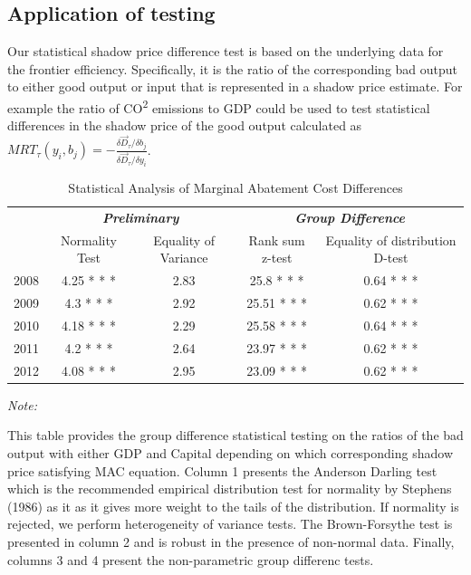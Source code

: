 \documentclass[12pt,]{article}
\begin{document}
\hypertarget{application-of-testing}{%
\subsection{Application of testing}\label{application-of-testing}}

Our statistical shadow price difference test is based on the underlying data for the frontier efficiency. Specifically, it is the ratio of the corresponding bad output to either good output or input that is represented in a shadow price estimate. For example the ratio of CO\textsuperscript{2} emissions to GDP could be used to test statistical differences in the shadow price of the good output calculated as \(MRT_{\tau}(y_{i},b_{j})=-\frac{\delta \vec{D}_{\tau}/\delta b_{j}}{\delta \vec{D}_{\tau}/\delta y_{i}}\).

\begin{table}[H]

\caption{\label{tab:Test1}Statistical Analysis of Marginal Abatement Cost Differences}
\centering
\fontsize{10}{12}\selectfont
\begin{threeparttable}
\begin{tabular}[t]{lcccc}
\toprule
\multicolumn{1}{c}{\em{\textbf{}}} & \multicolumn{2}{c}{\em{\textbf{Preliminary}}} & \multicolumn{2}{c}{\em{\textbf{Group Difference }}} \\
\cmidrule(l{3pt}r{3pt}){2-3} \cmidrule(l{3pt}r{3pt}){4-5}
  & Normality Test & Equality of Variance & Rank sum z-test & Equality of distribution D-test\\
\midrule
2008 & 4.25 * * * & 2.83 & 25.8 * * * & 0.64 * * *\\
2009 & 4.3 * * * & 2.92 & 25.51 * * * & 0.62 * * *\\
2010 & 4.18 * * * & 2.29 & 25.58 * * * & 0.64 * * *\\
2011 & 4.2 * * * & 2.64 & 23.97 * * * & 0.62 * * *\\
2012 & 4.08 * * * & 2.95 & 23.09 * * * & 0.62 * * *\\
\bottomrule
\end{tabular}
\begin{tablenotes}
\item \textit{Note: } 
\item This table provides the group difference statistical testing on the ratios of the bad output with either GDP and Capital depending on which corresponding shadow price satisfying MAC equation. Column 1 presents the Anderson Darling test which is the recommended empirical distribution test for normality by Stephens (1986) as it as it gives more weight to the tails of the distribution.  If normality is rejected, we perform heterogeneity of variance tests. The Brown-Forsythe test is presented in column 2 and is robust in the presence of non-normal data. Finally, columns 3 and 4 present the non-parametric group differenc tests.
\end{tablenotes}
\end{threeparttable}
\end{table}
\end{document}
